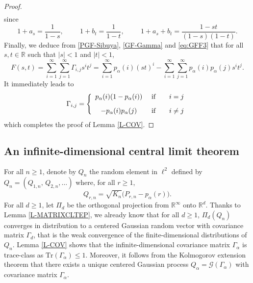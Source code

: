 \documentclass[twoside,12pt]{article}
\newcommand{\dR}{\mathbb{R}}
\newcommand{\cG}{\mathcal{G}}
\begin{document}
\begin{proof}
\begin{align}
\end{align}
since
$$
1+a_s= \frac{1}{1-s}, \hspace{1cm} 1+b_t= \frac{1}{1-t}, \hspace{1cm} 1+a_s+b_t= \frac{1-st}{(1-s)(1-t)}.
$$
Finally, we deduce from \eqref{PGF-Sibuya}, \eqref{GF-Gamma} and \eqref{eq:GFF3} that for all $s,t \in \dR$ such that $|s|<1$ and $|t|<1$,
\begin{equation*}
F(s,t) = \sum_{i=1}^\infty \sum_{j=1}^\infty \Gamma_{i,j} s^i t^j= \sum_{i=1}^\infty p_\alpha(i) (st)^i - 
\sum_{i=1}^\infty \sum_{j=1}^\infty p_\alpha(i) p_\alpha(j) s^i t^j.
\end{equation*}
It immediately leads to 
\begin{equation*}
\Gamma_{i,j}=\left \{ \begin{array}{ccc}
    p_\alpha(i)(1-p_\alpha(i)) & \text{ if } & \ \ i=j \vspace{2ex}\\
     -p_\alpha(i)p_\alpha(j) & \text{ if }  & \ \ i \neq j
   \end{array}  \right.
\end{equation*}
which completes the proof of Lemma \ref{L-COV}.
\end{proof}

\subsection{An infinite-dimensional central limit theorem}
\label{Sub-L2}

For all $n\geq1$, denote by $Q_n$ the random element in $\ell^{2}$ defined by $Q_n=(Q_{1,n},\,Q_{2,n},\ldots)$  where, for
all $r \geq 1$, 
\begin{displaymath}
Q_{r,n}=\sqrt{K_{n}}\big(P_{r,n}-p_{\alpha}(r)\big).
\end{displaymath}
For all $d\geq 1$, let $\Pi_d$ be the orthogonal projection from $\dR^\infty$ onto $\dR^d$. Thanks to
Lemma \ref{L-MATRIXCLTEP}, we already  know that for all $d\geq 1$, $\Pi_d(Q_n)$ converges in distribution to 
a centered Gaussian random vector with covariance matrix $\Gamma_d$, that is the weak convergence of the finite-dimensional distributions of $Q_n$. Lemma \ref{L-COV} shows that the infinite-dimensional covariance matrix
$\Gamma_\alpha$ is trace-class as $\text{Tr}(\Gamma_\alpha) \leq 1$. Moreover, it follows from the Kolmogorov extension theorem that there exists a unique centered Gaussian process $Q_\alpha=\cG(\Gamma_\alpha)$ with covariance matrix $\Gamma_\alpha$.
\end{document}
